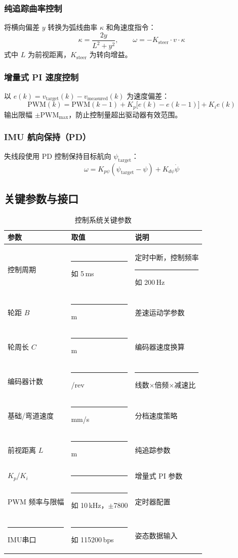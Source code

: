 \documentclass[12pt,a4paper,fontset=fandol]{ctexart}
\newcommand{\blank}{\rule{4cm}{0.4pt}}   %
\begin{document}
\subsubsection*{纯追踪曲率控制}
将横向偏差 $y$ 转换为弧线曲率 $\kappa$ 和角速度指令：
\begin{equation}
  \kappa = \frac{2y}{L^2 + y^2}, \qquad
  \omega = -K_{\text{steer}} \cdot v \cdot \kappa
  \label{eq:pure_pursuit}
\end{equation}
式中 $L$ 为前视距离，$K_{\text{steer}}$ 为转向增益。

\subsubsection*{增量式 PI 速度控制}
以 $e(k) = v_{\text{target}}(k) - v_{\text{measured}}(k)$ 为速度偏差：
\begin{equation}
  \text{PWM}(k) = \text{PWM}(k-1) + K_p\bigl[e(k) - e(k-1)\bigr] + K_i e(k)
  \label{eq:pi}
\end{equation}
输出限幅 $\pm \text{PWM}_{\max}$，防止控制量超出驱动器有效范围。

\subsubsection*{IMU 航向保持（PD）}
失线段使用 PD 控制保持目标航向 $\psi_{\text{target}}$：
\begin{equation}
  \omega = K_{p\psi}(\psi_{\text{target}} - \psi) + K_{d\psi} \dot{\psi}
  \label{eq:heading_pd}
\end{equation}

\subsection{关键参数与接口}
\begin{table}[H]
\centering
\caption{控制系统关键参数}
\begin{tabularx}{\textwidth}{p{3.2cm}p{3.6cm}Y}
\toprule
参数 & 取值 & 说明\\
\midrule
控制周期 & \blank{如 5\,ms} & 定时中断，控制频率 \blank{如 200\,Hz}\\
轮距 $B$ & \blank{m} & 差速运动学参数\\
轮周长 $C$ & \blank{m} & 编码器速度换算\\
编码器计数 & \blank{/rev} & \blank{线数×倍频×减速比}\\
基础/弯道速度 & \blank{mm/s} & 分档速度策略\\
前视距离 $L$ & \blank{m} & 纯追踪参数\\
$K_p$/$K_i$ & \blank{} & 增量式 PI 参数\\
PWM 频率与限幅 & \blank{如 10\,kHz，$\pm$7800} & 定时器配置\\
\blank{IMU}串口 & \blank{如 115200\,bps} & 姿态数据输入\\
\bottomrule
\end{tabularx}
\end{table}
\end{document}
